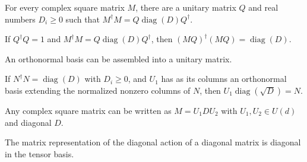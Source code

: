{\chat
\begin{theorem}\label{thm:svd_spectral}
  \leanok
  For every complex square matrix $M$, there are a unitary matrix $Q$ and real numbers $D_i\ge0$ such that $M^\dagger M=Q\operatorname{diag}(D)Q^\dagger$.
\end{theorem}
} %

{\chat
\begin{theorem}\label{thm:conjTranspose_mul_self_of_spectral}
  \leanok
  If $Q^\dagger Q=1$ and $M^\dagger M=Q\operatorname{diag}(D)Q^\dagger$, then $(M Q)^\dagger(M Q)=\operatorname{diag}(D)$.
\end{theorem}
} %

\begin{theorem}\label{thm:exists_unitary_of_orthonormalBasis}
  \leanok
  An orthonormal basis can be assembled into a unitary matrix.
\end{theorem}

{\chat
\begin{theorem}\label{thm:cols_mul_diag_sqrt}
  \leanok
  If $N^\dagger N=\operatorname{diag}(D)$ with $D_i\ge0$, and $U_1$ has as its columns an orthonormal basis extending the normalized nonzero columns of $N$, then $U_1\operatorname{diag}(\sqrt D)=N$.
\end{theorem}
} %

{\chat
\begin{theorem}\label{thm:svd_exists}
  \leanok
  Any complex square matrix can be written as $M = U_1 D U_2$ with $U_1, U_2 \in U(d)$ and diagonal $D$.
\end{theorem}
} %

\begin{theorem}\label{thm:toEndMatrix_diagAction_diagonal}
  \leanok
  The matrix representation of the diagonal action of a diagonal matrix is diagonal in the tensor basis.
\end{theorem}

